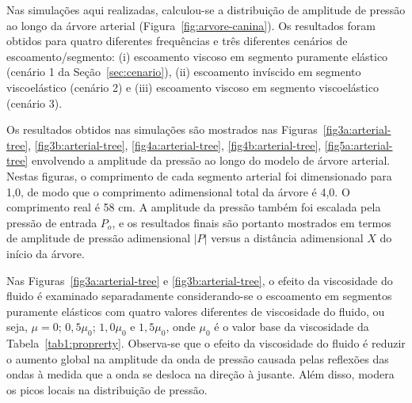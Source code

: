 \documentclass[a4paper,12pt]{monografia}
\theoremstyle{plain}
\theoremstyle{definition}
\theoremstyle{remark}
\begin{document}
Nas simulações aqui realizadas, calculou-se a distribuição de amplitude de pressão ao longo da árvore arterial (Figura~\ref{fig:arvore-canina}). Os resultados foram obtidos para quatro diferentes frequên\-cias e três diferentes cenários de escoamento/segmento: (i) escoamento viscoso em segmento puramente elástico (cenário 1 da Seção~\ref{sec:cenario}), (ii) escoamento invíscido em segmento viscoelástico (cenário 2) e (iii) escoamento viscoso em segmento viscoelástico (cenário 3). 

Os resultados obtidos nas simulações são mostrados nas Figuras~\ref{fig3a:arterial-tree}, \ref{fig3b:arterial-tree}, \ref{fig4a:arterial-tree}, \ref{fig4b:arterial-tree}, \ref{fig5a:arterial-tree} envolvendo a amplitude da pressão ao longo do modelo de árvore arterial. Nestas figuras, o comprimento de cada segmento arterial foi dimensionado para 1,0, de modo que o comprimento adimensional total da árvore é 4,0. O comprimento real é 58 cm. A amplitude da pressão também foi escalada pela pressão de entrada $P_o$, e os resultados finais são portanto mostrados em termos de amplitude de pressão adimensional $|P|$ versus a distância adimensional $X$ do início da árvore.

Nas Figuras~\ref{fig3a:arterial-tree} e \ref{fig3b:arterial-tree}, o efeito da viscosidade do fluido é examinado separadamente conside\-ran\-do-se o escoamento em segmentos puramente elásticos com quatro valores diferentes de viscosidade do fluido, ou seja, $\mu = 0$; $0,5 \mu_0$; $1,0 \mu_0$ e $1,5 \mu_0$, onde $\mu_0$ é o valor base da viscosidade da Tabela~\ref{tab1:proprerty}. Observa-se que o efeito da viscosidade do fluido é reduzir o aumento global na amplitude da onda de pressão causada pelas reflexões das ondas à medida que a onda se desloca na direção à jusante. Além disso, modera os picos locais na distribuição de pressão.
\end{document}
